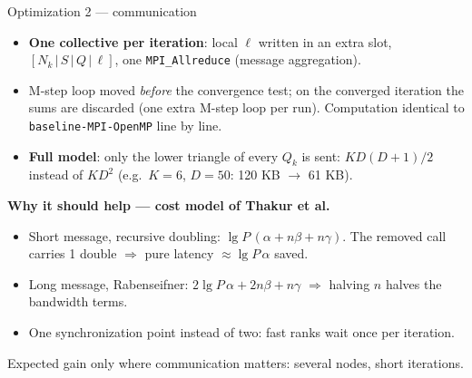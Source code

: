 \documentclass[aspectratio=169,10pt]{beamer}
\newcommand{\vbase}{\texttt{baseline-MPI-OpenMP}}
\newcommand{\takeaway}[1]{\begin{center}\colorbox{accent!10}{\parbox{0.92\textwidth}{\centering\small #1}}\end{center}}
\begin{document}
\begin{frame}{Optimization 2 --- communication}
\footnotesize
\begin{itemize}
\item \textbf{One collective per iteration}: local $\ell$ written in an extra slot, $[N_k\,|\,S\,|\,Q\,|\,\ell]$, one \texttt{MPI\_Allreduce} (message aggregation).
\item M-step loop moved \emph{before} the convergence test; on the converged iteration the sums are discarded (one extra M-step loop per run). Computation identical to \vbase{} line by line.
\item \textbf{Full model}: only the lower triangle of every $Q_k$ is sent: $K D(D+1)/2$ instead of $KD^2$ (e.g.\ $K=6$, $D=50$: 120 KB $\to$ 61 KB).
\end{itemize}
\textbf{Why it should help --- cost model of Thakur et al.}
\begin{itemize}
\item Short message, recursive doubling: $\lg P\,(\alpha+n\beta+n\gamma)$. The removed call carries 1 double $\Rightarrow$ pure latency $\approx \lg P\,\alpha$ saved.
\item Long message, Rabenseifner: $2\lg P\,\alpha+2n\beta+n\gamma$ $\Rightarrow$ halving $n$ halves the bandwidth terms.
\item One synchronization point instead of two: fast ranks wait once per iteration.
\end{itemize}
\takeaway{Expected gain only where communication matters: several nodes, short iterations.}
\end{frame}
\end{document}
